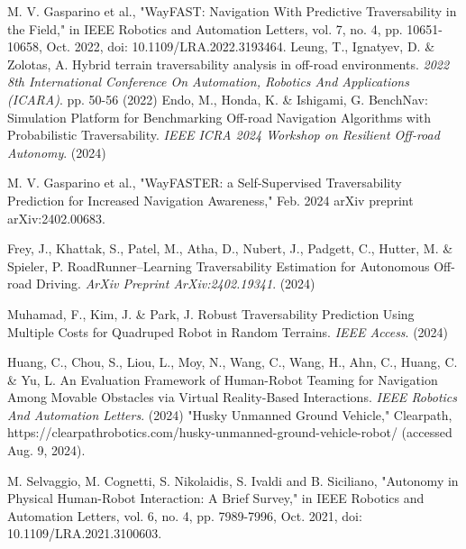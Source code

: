 \documentclass[letterpaper, 10 pt, conference]{ieeeconf}  %
\begin{document}
\begin{thebibliography}{99}

 M. V. Gasparino et al., "WayFAST: Navigation With Predictive Traversability in the Field," in IEEE Robotics and Automation Letters, vol. 7, no. 4, pp. 10651-10658, Oct. 2022, doi: 10.1109/LRA.2022.3193464.
Leung, T., Ignatyev, D. \& Zolotas, A. Hybrid terrain traversability analysis in off-road environments. {\em 2022 8th International Conference On Automation, Robotics And Applications (ICARA)}. pp. 50-56 (2022)
Endo, M., Honda, K. \& Ishigami, G. BenchNav: Simulation Platform for Benchmarking Off-road Navigation Algorithms with Probabilistic Traversability. {\em IEEE ICRA 2024 Workshop on Resilient Off-road Autonomy}. (2024)

 M. V. Gasparino et al., "WayFASTER: a Self-Supervised Traversability Prediction for Increased Navigation Awareness," Feb. 2024 arXiv preprint arXiv:2402.00683.

Frey, J., Khattak, S., Patel, M., Atha, D., Nubert, J., Padgett, C., Hutter, M. \& Spieler, P. RoadRunner–Learning Traversability Estimation for Autonomous Off-road Driving. {\em ArXiv Preprint ArXiv:2402.19341}. (2024)

Muhamad, F., Kim, J. \& Park, J. Robust Traversability Prediction Using Multiple Costs for Quadruped Robot in Random Terrains. {\em IEEE Access}. (2024)



Huang, C., Chou, S., Liou, L., Moy, N., Wang, C., Wang, H., Ahn, C., Huang, C. \& Yu, L. An Evaluation Framework of Human-Robot Teaming for Navigation Among Movable Obstacles via Virtual Reality-Based Interactions. {\em IEEE Robotics And Automation Letters}. (2024)
"Husky Unmanned Ground Vehicle," Clearpath, https://clearpathrobotics.com/husky-unmanned-ground-vehicle-robot/ (accessed Aug. 9, 2024).

 M. Selvaggio, M. Cognetti, S. Nikolaidis, S. Ivaldi and B. Siciliano, "Autonomy in Physical Human-Robot Interaction: A Brief Survey," in IEEE Robotics and Automation Letters, vol. 6, no. 4, pp. 7989-7996, Oct. 2021, doi: 10.1109/LRA.2021.3100603.




\end{thebibliography}
\end{document}
